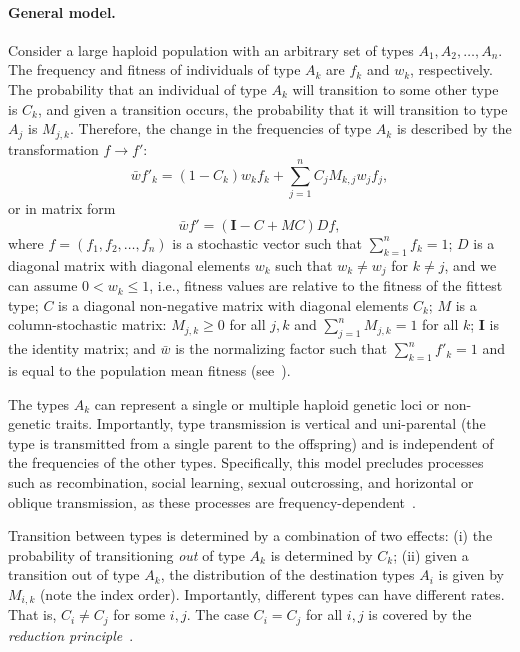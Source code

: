 \documentclass[9pt, a4paper, twocolumn]{extarticle}
\newcommand{\ci}{\mathbf{I}}
\begin{document}
\paragraph*{General model.}\label{sec:general_model}
Consider a large haploid population with an arbitrary set of types $A_1, A_2, \ldots, A_n$.
The frequency and fitness of individuals of type $A_k$ are $f_k$ and $w_k$, respectively.
The probability that an individual of type $A_k$ will transition to some other type is $C_k$, and given a transition occurs, the probability that it will transition to type $A_j$ is $M_{j,k}$.
Therefore, the change in the frequencies of type $A_k$ is described by the transformation $f \to f'$: 
\begin{equation}
\bar{w} f'_k = (1-C_k) w_k f_k + \sum_{j=1}^{n}{C_j M_{k,j} w_j f_j},
\label{eq:model_sum}
\end{equation}
or in matrix form
\begin{equation}
\bar{w} f' = (\ci - C + MC)D f,
\label{eq:model}
\end{equation}
where $f=(f_1, f_2, \ldots, f_n)$ is a stochastic vector such that $\sum_{k=1}^n{f_k} = 1$;
$D$ is a diagonal matrix with diagonal elements $w_k$ such that $w_k \ne w_j$ for $k \ne j$, and we can assume $0 < w_k \le 1$, i.e., fitness values are relative to the fitness of the fittest type; 
$C$ is a diagonal non-negative matrix with diagonal elements $C_k$;
$M$ is a column-stochastic matrix: $M_{j,k} \ge 0$ for all $j,k$ and $\sum_{j=1}^n {M_{j,k}} = 1$ for all $k$; 
$\ci$ is the identity matrix;
and $\bar{w}$ is the normalizing factor such that $\sum_{k=1}^n{f'_k}=1$ and is equal to the population mean fitness (see~).

The types $A_k$ can represent a single or multiple haploid genetic loci or non-genetic traits.
Importantly, type transmission is vertical and uni-parental (the type is transmitted from a single parent to the offspring) and is independent of the frequencies of the other types.
Specifically, this model precludes processes such as recombination, social learning, sexual outcrossing, and horizontal or oblique transmission, as these processes are frequency-dependent~\cite[pg.~54]{Cavalli-Sforza1981}.

Transition between types is determined by a combination of two effects:
(i) the probability of transitioning \emph{out} of type $A_k$ is determined by $C_k$;
(ii) given a transition out of type $A_k$, the distribution of the destination types $A_i$ is given by $M_{i,k}$ (note the index order).
Importantly, different types can have different rates.
That is, $C_i \ne C_j$ for some $i,j$. The case $C_i = C_j$ for all $i,j$ is covered by the \emph{reduction principle}~\citep[see][]{Altenberg2017}.
\end{document}
